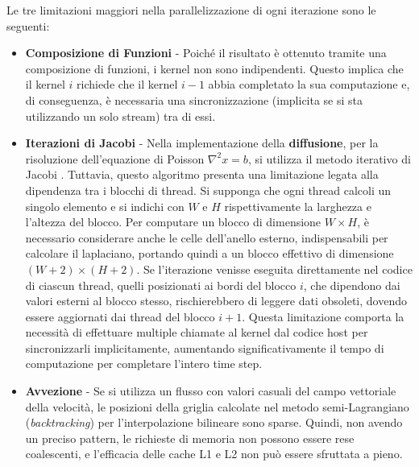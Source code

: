 \documentclass[12pt,a4paper,openany,twoside]{article}
\begin{document}
Le tre limitazioni maggiori nella parallelizzazione di ogni iterazione sono le seguenti:
\begin{itemize}
    \item \textbf{Composizione di Funzioni} - Poiché il risultato è ottenuto tramite una composizione di funzioni, i kernel non sono indipendenti. Questo implica che il kernel \(i\) richiede che il kernel \(i - 1\) abbia completato la sua computazione e, di conseguenza, è necessaria una sincronizzazione (implicita se si sta utilizzando un solo stream) tra di essi.
    \item \textbf{Iterazioni di Jacobi} - Nella implementazione della \textbf{diffusione}, per la risoluzione dell'equazione di Poisson \(\nabla^2 x = b\), si utilizza il metodo iterativo di Jacobi \cite{golub2013matrix}. Tuttavia, questo algoritmo presenta una limitazione legata alla dipendenza tra i blocchi di thread. Si supponga che ogni thread calcoli un singolo elemento e si indichi con \(W\) e \(H\) rispettivamente la larghezza e l'altezza del blocco. Per computare un blocco di dimensione \(W \times H\), è necessario considerare anche le celle dell'anello esterno, indispensabili per calcolare il laplaciano, portando quindi a un blocco effettivo di dimensione \((W + 2) \times (H + 2)\). Se l'iterazione venisse eseguita direttamente nel codice di ciascun thread, quelli posizionati ai bordi del blocco \(i\), che dipendono dai valori esterni al blocco stesso, rischierebbero di leggere dati obsoleti, dovendo essere aggiornati dai thread del blocco \(i + 1\). Questa limitazione comporta la necessità di effettuare multiple chiamate al kernel dal codice host per sincronizzarli implicitamente, aumentando significativamente il tempo di computazione per completare l'intero time step.
    
    \item \textbf{Avvezione} - Se si utilizza un flusso con valori casuali del campo vettoriale della velocità, le posizioni della griglia calcolate nel metodo semi-Lagrangiano (\emph{backtracking}) per l'interpolazione bilineare sono sparse. Quindi, non avendo un preciso pattern, le richieste di memoria non possono essere rese coalescenti, e l'efficacia delle cache L1 e L2 non può essere sfruttata a pieno.
\end{itemize}
\end{document}
